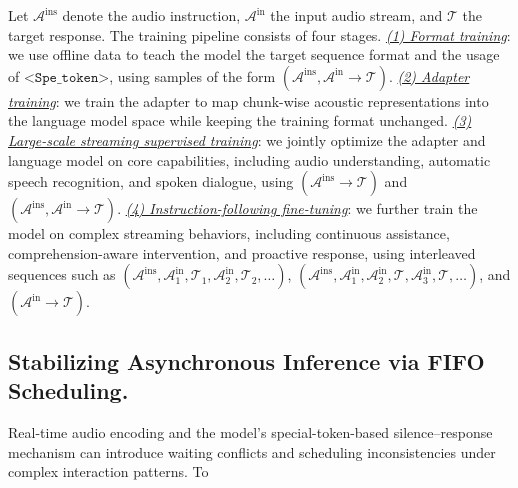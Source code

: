 \documentclass{article}
\begin{document}
Let $\mathcal{A}^{\mathrm{ins}}$ denote the audio instruction, $\mathcal{A}^{\mathrm{in}}$ the input audio stream, and $\mathcal{T}$ the target response. The training pipeline consists of four stages. \underline{\textit{(1) Format training}}: we use offline data to teach the model the target sequence format and the usage of $\texttt{<Spe\_token>}$, using samples of the form $(\mathcal{A}^{\mathrm{ins}}, \mathcal{A}^{\mathrm{in}} \rightarrow \mathcal{T})$. \underline{\textit{(2) Adapter training}}: we train the adapter to map chunk-wise acoustic representations into the language model space while keeping the training format unchanged. \underline{\textit{(3) Large-scale streaming supervised training}}: we jointly optimize the adapter and language model on core capabilities, including audio understanding, automatic speech recognition, and spoken dialogue, using $(\mathcal{A}^{\mathrm{ins}} \rightarrow \mathcal{T})$ and $(\mathcal{A}^{\mathrm{ins}}, \mathcal{A}^{\mathrm{in}} \rightarrow \mathcal{T})$. \underline{\textit{(4) Instruction-following fine-tuning}}: we further train the model on complex streaming behaviors, including continuous assistance, comprehension-aware intervention, and proactive response, using interleaved sequences such as $(\mathcal{A}^{\mathrm{ins}}, \mathcal{A}^{\mathrm{in}}_1, \mathcal{T}_1, \mathcal{A}^{\mathrm{in}}_2, \mathcal{T}_2, \ldots)$, $(\mathcal{A}^{\mathrm{ins}}, \mathcal{A}^{\mathrm{in}}_1, \mathcal{A}^{\mathrm{in}}_2, \mathcal{T}, \mathcal{A}^{\mathrm{in}}_3, \mathcal{T}, \ldots)$, and $(\mathcal{A}^{\mathrm{in}} \rightarrow \mathcal{T})$.


\subsection{Stabilizing Asynchronous Inference via FIFO Scheduling.}
\vspace{-2mm}

Real-time audio encoding and the model's special-token-based silence--response mechanism can introduce waiting conflicts and scheduling inconsistencies under complex interaction patterns. To
\end{document}

